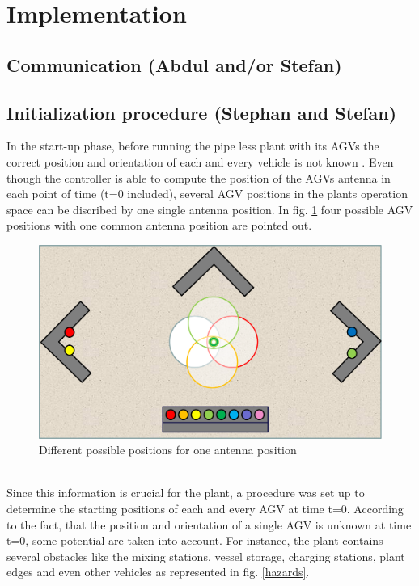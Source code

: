 \section{Implementation}\label{Sec_Imp}

\subsection{Communication (Abdul and/or Stefan)}

\subsection{Initialization procedure (Stephan and Stefan)}\label{Sec_Imp_Ini}
In the start-up phase, before running the pipe less plant with its AGVs the correct position and orientation of each and every vehicle is not known . Even though the controller is able to compute the position of the AGVs antenna in each point of time (t=0 included),  several AGV positions in the plants operation space can be discribed by one single antenna position. In fig. \ref{possible_initial_positions} four possible AGV positions with one common antenna position are pointed out. \\
\begin{figure}[!htbp]
\centering
\includegraphics[width = 16cm]{Pictures/possible_initial_positions}
\caption{Different possible positions for one antenna position}
\label{possible_initial_positions}
\end{figure}\\
Since this information is crucial for the plant, a procedure was set up to determine the starting positions of each and every AGV at time t=0.
According to the fact, that the position and orientation of a single AGV is unknown at time t=0, some potential are taken into account. For instance, the plant contains several obstacles like the mixing stations, vessel storage, charging stations, plant edges and even other vehicles as represented in fig. \ref{hazards}.\\
